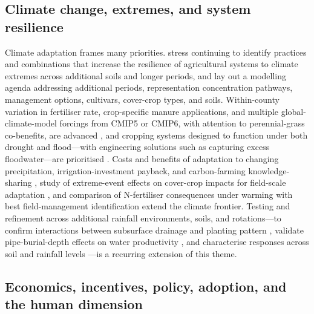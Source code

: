 \documentclass[11pt]{article}
\begin{document}
\subsection{Climate change, extremes, and system resilience}

Climate adaptation frames many priorities. \textcite{Saha2024} stress continuing to identify practices and combinations that increase the resilience of agricultural systems to climate extremes across additional soils and longer periods, and \textcite{Malone2020} lay out a modelling agenda addressing additional periods, representation concentration pathways, management options, cultivars, cover-crop types, and soils. Within-county variation in fertiliser rate, crop-specific manure applications, and multiple global-climate-model forcings from CMIP5 or CMIP6, with attention to perennial-grass co-benefits, are advanced \parencite{Ferin2023}, and cropping systems designed to function under both drought and flood---with engineering solutions such as capturing excess floodwater---are prioritised \parencite{Dietzel2016}. Costs and benefits of adaptation to changing precipitation, irrigation-investment payback, and carbon-farming knowledge-sharing \parencite{PeltonenSainio2021}, study of extreme-event effects on cover-crop impacts for field-scale adaptation \parencite{Gupta2023b}, and comparison of N-fertiliser consequences under warming with best field-management identification \parencite{Haghnazari2020} extend the climate frontier. Testing and refinement across additional rainfall environments, soils, and rotations---to confirm interactions between subsurface drainage and planting pattern \parencite{Takeshima2023}, validate pipe-burial-depth effects on water productivity \parencite{Liu2025}, and characterise responses across soil and rainfall levels \parencite{Grewal2025,Negm2014,BENOIT1967}---is a recurring extension of this theme.

\subsection{Economics, incentives, policy, adoption, and the human dimension}
\end{document}
